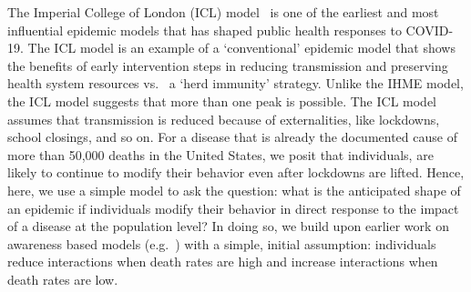 The Imperial College of London (ICL) model~\citep{ferguson2020report} is
one of the earliest and most influential epidemic models that has shaped public health responses to COVID-19. The ICL model is an
example of a `conventional' epidemic model
that shows the benefits of  early intervention steps in reducing
transmission and preserving health system resources vs.~ 
a `herd immunity' strategy.  Unlike the IHME model,
the ICL model suggests that more than one peak is possible.
The ICL model assumes that
transmission is reduced because of externalities, like lockdowns,
school closings, and so on.  For a disease
that is already the documented cause of more than 50,000 deaths
in the United States, we posit that individuals, 
are likely to continue to modify
their behavior even after lockdowns are lifted.  
Hence, here, we use a simple model to
ask the question: what is the anticipated
shape of an epidemic if individuals modify their behavior in direct
response to the impact of a disease at the population level? In doing so,
we build upon earlier work on awareness based models (e.g.~\citep{funk2009spread,funk2010modelling,eksin2017disease, eksin2019systematic}) with a
simple, initial assumption: individuals reduce interactions when 
death rates are high and increase interactions when death rates are low.  


